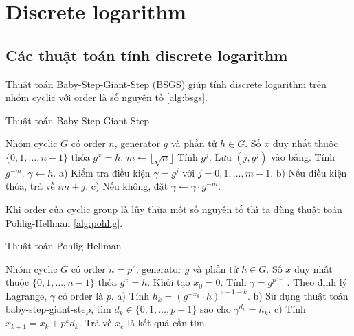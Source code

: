 \chapter{Discrete logarithm}

\section{Các thuật toán tính discrete logarithm}

Thuật toán Baby-Step-Giant-Step (BSGS) giúp tính discrete logarithm trên nhóm cyclic với order là số nguyên tố \ref{alg:bsgs}.

\begin{algorithm}[H]
    \caption{Thuật toán Baby-Step-Giant-Step}
    \label{alg:bsgs}
    \begin{algorithmic}[1]
        \Require Nhóm cyclic $G$ có order $n$, generator $g$ và phần tử $h \in G$.
        \Ensure Số $x$ duy nhất thuộc $\{ 0, 1, \ldots, n-1 \}$ thỏa $g^x = h$.
        $m \gets \lfloor \sqrt{n} \rfloor$
            \State Tính $g^j$. Lưu $(j, g^j)$ vào bảng.
        \EndFor
        \State Tính $g^{-m}$.
        \State $\gamma \gets h$.
            \State a) Kiểm tra điều kiện $\gamma = g^j$ với $j = 0, 1, \ldots, m-1$.
            \State b) Nếu điều kiện thỏa, trả về $im + j$.
            \State c) Nếu không, đặt $\gamma \gets \gamma \cdot g^{-m}$.
        \EndFor
    \end{algorithmic}
\end{algorithm}

Khi order của cyclic group là lũy thừa một số nguyên tố thì ta dùng thuật toán Pohlig-Hellman \ref{alg:pohlig}.

\begin{algorithm}[H]
    \caption{Thuật toán Pohlig-Hellman}
    \label{alg:pohlig}
    \begin{algorithmic}[1]
        \Require Nhóm cyclic $G$ có order $n=p^e$, generator $g$ và phần tử $h \in G$.
        \Ensure Số $x$ duy nhất thuộc $\{ 0, 1, \ldots, n-1 \}$ thỏa $g^x = h$.
        \State Khởi tạo $x_0 = 0$.
        \State Tính $\gamma = g^{p^{e-1}}$. Theo định lý Lagrange, $\gamma$ có order là $p$.
            \State a) Tính $h_k = (g^{-x_k} \cdot h)^{e-1-k}$.
            \State b) Sử dụng thuật toán baby-step-giant-step, tìm $d_k \in \{ 0, 1, \ldots, p-1 \}$ sao cho $\gamma^{d_k} = h_k$. %
            \State c) Tính $x_{k+1} = x_k + p^k d_k$.
        \EndFor
        \State Trả về $x_e$ là kết quả cần tìm.
    \end{algorithmic}
\end{algorithm}
